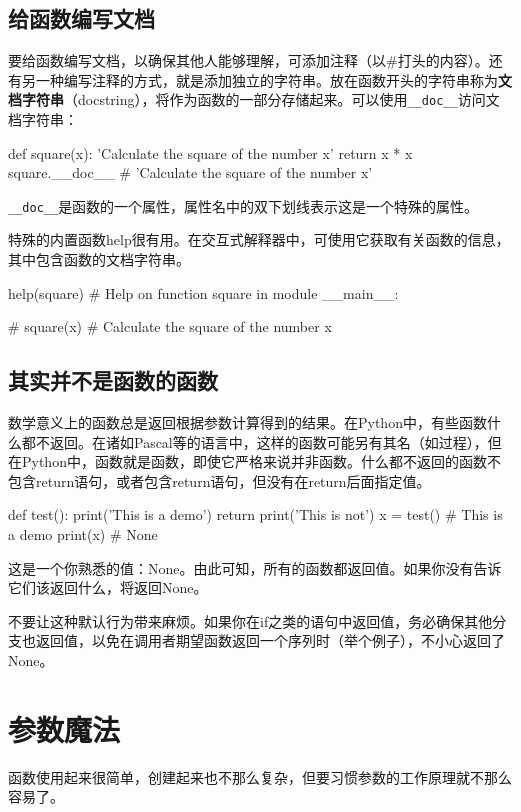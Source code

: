 \subsection{给函数编写文档}
要给函数编写文档，以确保其他人能够理解，可添加注释（以\#打头的内容）。还有另一种编写注释的方式，就是添加独立的字符串。放在函数开头的字符串称为\textbf{文档字符串}（docstring），将作为函数的一部分存储起来。可以使用\verb|__doc__|访问文档字符串：
\begin{pyc}
def square(x):
    'Calculate the square of the number x'
    return x * x
square.__doc__
# 'Calculate the square of the number x'
\end{pyc}

\begin{tcolorbox}
    \verb|__doc__|是函数的一个属性，属性名中的双下划线表示这是一个特殊的属性。
\end{tcolorbox}
特殊的内置函数help很有用。在交互式解释器中，可使用它获取有关函数的信息，其中包含函数的文档字符串。
\begin{pyc}
help(square)
# Help on function square in module __main__:

# square(x)
#     Calculate the square of the number x
\end{pyc}
\subsection{其实并不是函数的函数}
数学意义上的函数总是返回根据参数计算得到的结果。在Python中，有些函数什么都不返回。在诸如Pascal等的语言中，这样的函数可能另有其名（如过程），但在Python中，函数就是函数，即使它严格来说并非函数。什么都不返回的函数不包含return语句，或者包含return语句，但没有在return后面指定值。

\begin{pyc}
def test():
    print('This is a demo')
    return
    print('This is not')
x = test()  # This is a demo
print(x)  # None
\end{pyc}
这是一个你熟悉的值：None。由此可知，所有的函数都返回值。如果你没有告诉它们该返回什么，将返回None。

\begin{tcolorbox}
    不要让这种默认行为带来麻烦。如果你在if之类的语句中返回值，务必确保其他分支也返回值，以免在调用者期望函数返回一个序列时（举个例子），不小心返回了None。
\end{tcolorbox}
\section{参数魔法}
函数使用起来很简单，创建起来也不那么复杂，但要习惯参数的工作原理就不那么容易了。
